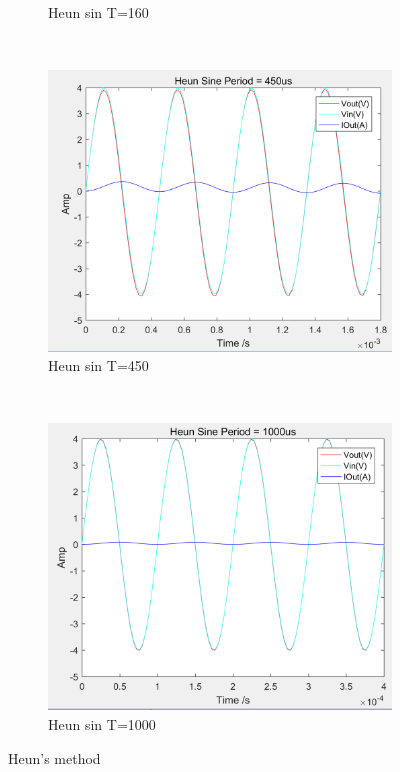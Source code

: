 \documentclass[a4paper, 12pt]{article}
\begin{document}
\begin{figure}[h]
\begin{subfigure}[b]{0.4\textwidth}
            \caption{Heun sin T=160}
      \end{subfigure}
       ~
      \begin{subfigure}[b]{0.4\textwidth}
            \includegraphics[width=\textwidth]{ex1/heun_sin_450.PNG}
            \caption{Heun sin T=450}
      \end{subfigure}
       ~
      \begin{subfigure}[b]{0.4\textwidth}
            \includegraphics[width=\textwidth]{ex1/heun_sin_1000.PNG}
            \caption{Heun sin T=1000}
      \end{subfigure}
      \caption{Heun's method}
\end{figure}
\end{document}
